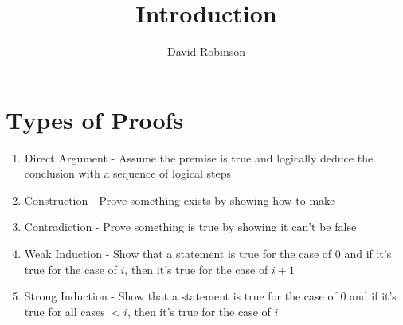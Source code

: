 \documentclass{article}
\title{Introduction}
\author{David Robinson}
\date{}
\begin{document}
\maketitle

\section*{Types of Proofs}

\begin{enumerate}
    \item Direct Argument - Assume the premise is true and logically deduce the conclusion with a sequence of logical steps
    \item Construction - Prove something exists by showing how to make
    \item Contradiction - Prove something is true by showing it can't be false
    \item Weak Induction - Show that a statement is true for the case of $0$ and if it's true for the case of $i$, then it's true for the case of $i+1$
    \item Strong Induction - Show that a statement is true for the case of $0$ and if it's true for all cases $<i$, then it's true for the case of $i$
\end{enumerate}
\end{document}
